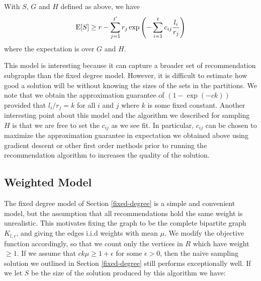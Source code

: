 \begin{thm}
With $S$, $G$ and $H$ defined as above, we have
\[ \text{E}[S] \geq r - \sum_{j=1}^{t'} r_j \exp\left(-\sum_{i=1}^t c_{ij} \frac{l_i}{r_j}\right)\]
where the expectation is over $G$ and $H$.
\end{thm}
%

This model is interesting because it can capture a broader set of
recommendation subgraphs than the fixed degree model. However, it is
difficult to estimate how good a solution will be without knowing
the sizes of the sets in the partitions. We note that we
obtain the approximation guarantee of $(1-\exp(-ck))$ provided that
$l_i/r_j = k$ for all $i$ and $j$ where $k$ is some fixed
constant. Another interesting point about this model and the algorithm
we described for sampling $H$ is that we are free to set the $c_{ij}$
as we see fit. In particular, $c_{ij}$ can be chosen to maximize the
approximation guarantee in expectation we obtained above using
gradient descent or other first order methods prior to running the
recommendation algorithm to increases the quality of the solution.


\subsection{Weighted Model}
\label{weighted}
The fixed degree model of Section \ref{fixed-degree} is a simple and
convenient model, but the assumption that all recommendations hold the
same weight is unrealistic. This motivates fixing the graph to be the
complete bipartite graph $K_{l,r}$, and giving the edges i.i.d weights
with mean $\mu$. We modify the objective function accordingly, so that
we count only the vertices in $R$ which have weight $\geq 1$. If we
assume that $ck\mu \geq 1+\epsilon$ for some $\epsilon > 0$, then 
the naive sampling solution we outlined in Section \ref{fixed-degree}
still performs exceptionally well. If we let $S$ be the size of the 
solution produced by this algorithm we have:

